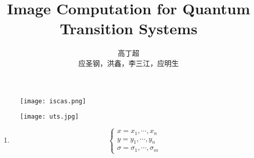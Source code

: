 \documentclass[aspectratio=1610,18pt]{ctexbeamer}
\title[TDD in quantum]{Image Computation for Quantum Transition Systems}
\author{高丁超\\ 应圣钢，洪鑫，李三江，应明生}
\begin{document}
\begin{frame}[plain]
  \titlepage
  \begin{figure}
    \centering
    \begin{minipage}[t]{0.48\textwidth}
    \centering
    \texttt{[image: iscas.png]}
    \end{minipage}
    \begin{minipage}[t]{0.48\textwidth}
    \centering
    \texttt{[image: uts.jpg]}
    \end{minipage}
  \end{figure}
\end{frame}
\begin{frame}
  \begin{enumerate}
    \item \begin{equation}
      \begin{cases}
        x = x_1, \cdots, x_n\\
        y = y_1, \cdots, y_n\\
        \sigma = \sigma_1, \cdots, \sigma_m
      \end{cases}
    \end{equation}
  \end{enumerate}
\end{frame}

\begin{frame}

\end{frame}
\end{document}
